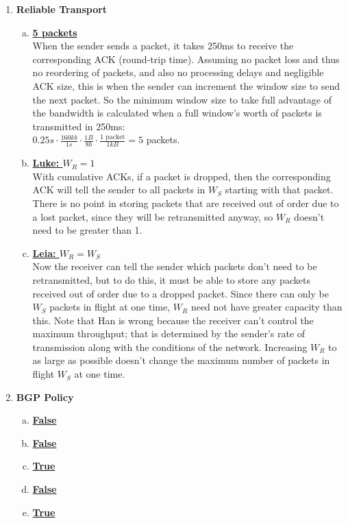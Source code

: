 \documentclass[11pt,fleqn]{article}
\begin{document}
\begin{enumerate}[1.]
\newpage
\item \textbf{Reliable Transport}
\begin{enumerate}[(a)]
\item \textbf{\underline{5 packets}} \\
When the sender sends a packet, it takes 250ms to receive the corresponding ACK (round-trip time). Assuming no packet loss and thus no reordering of packets, and also no processing delays and negligible ACK size, this is when the sender can increment the window size to send the next packet. So the minimum window size to take full advantage of the bandwidth is calculated when a full window's worth of packets is transmitted in 250ms: \\
$\displaystyle 0.25s \cdot \frac{160kb}{1s} \cdot \frac{1B}{8b} \cdot \frac{1 \text{ packet}}{1kB} = 5$ packets.
\item \textbf{\underline{Luke: $W_R = 1$}} \\
With cumulative ACKs, if a packet is dropped, then the corresponding ACK will tell the sender to all packets in $W_S$ starting with that packet. There is no point in storing packets that are received out of order due to a lost packet, since they will be retransmitted anyway, so $W_R$ doesn't need to be greater than 1.
\item \textbf{\underline{Leia: $W_R = W_S$}} \\
Now the receiver can tell the sender which packets don't need to be retransmitted, but to do this, it must be able to store any packets received out of order due to a dropped packet. Since there can only be $W_S$ packets in flight at one time, $W_R$ need not have greater capacity than this. Note that Han is wrong because the receiver can't control the maximum throughput; that is determined by the sender's rate of transmission along with the conditions of the network. Increasing $W_R$ to as large as possible doesn't change the maximum number of packets in flight $W_S$ at one time.
\end{enumerate}

\newpage
\item \textbf{BGP Policy}
\begin{enumerate}[(a)]
\item \textbf{\underline{False}}
\item \textbf{\underline{False}}
\item \textbf{\underline{True}}
\item \textbf{\underline{False}}
\item \textbf{\underline{True}}
\end{enumerate}


\end{enumerate}
\end{document}
